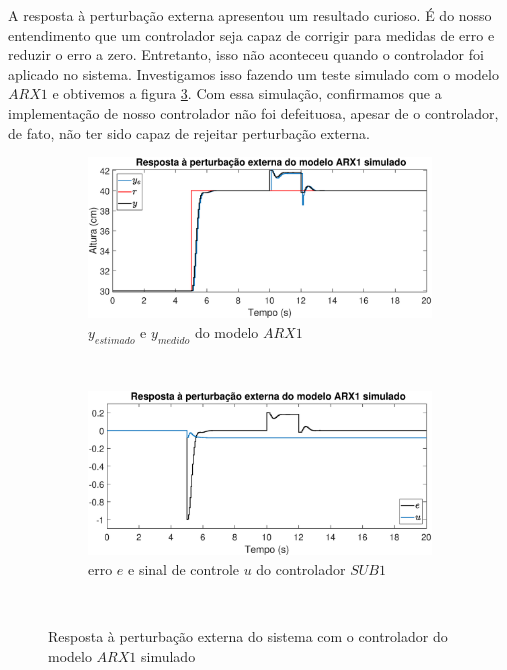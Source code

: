 A resposta à perturbação externa apresentou um resultado curioso. É do nosso entendimento que um controlador seja capaz de corrigir para medidas de erro e reduzir o erro a zero. Entretanto, isso não aconteceu quando o controlador foi aplicado no sistema. Investigamos isso fazendo um teste simulado com o modelo $ARX1$ e obtivemos a figura \ref{fig:steparx1}. Com essa simulação, confirmamos que a implementação de nosso controlador não foi defeituosa, apesar de o controlador, de fato, não ter sido capaz de rejeitar perturbação externa.

\begin{figure}[htb]
	\centering
	\begin{subfigure}[t]{0.48\textwidth}
		\includegraphics[width=1\linewidth]{pasta1_figuras/steparx1simy}
		\caption[$y_{estimado}$ e $y_{medido}$ do modelo $ARX1$]{$y_{estimado}$ e $y_{medido}$ do modelo $ARX1$}
		\label{fig:steparx1simy}
	\end{subfigure}
	~ %
	\begin{subfigure}[t]{0.48\textwidth}
		\includegraphics[width=1\linewidth]{pasta1_figuras/steparx1sime}
		\caption[erro $e$ e sinal de controle $u$ do controlador $SUB1$]{erro $e$ e sinal de controle $u$ do controlador $SUB1$}
		\label{fig:steparx1e}
	\end{subfigure}
	~ %
	
	\caption{Resposta à perturbação externa do sistema com o controlador do modelo $ARX1$ simulado}\label{fig:steparx1}
\end{figure}



